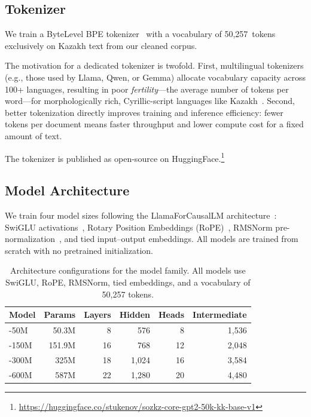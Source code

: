 \subsection{Tokenizer}
\label{sec:tokenizer}

We train a ByteLevel BPE tokenizer~\citep{sennrich2016bpe} with a vocabulary
of 50{,}257~tokens exclusively on Kazakh text from our cleaned corpus.

The motivation for a dedicated tokenizer is twofold. First, multilingual
tokenizers (e.g., those used by Llama, Qwen, or Gemma) allocate vocabulary
capacity across 100+ languages, resulting in poor \emph{fertility}---the average
number of tokens per word---for morphologically rich, Cyrillic-script languages
like Kazakh~\citep{rust2021tokenizer, toraman2023turkic}.
Second, better tokenization directly improves training and inference efficiency:
fewer tokens per document means faster throughput and lower compute cost for a
fixed amount of text.

The tokenizer is published as open-source on HuggingFace.\footnote{\url{https://huggingface.co/stukenov/sozkz-core-gpt2-50k-kk-base-v1}}

\subsection{Model Architecture}
\label{sec:architecture}

We train four model sizes following the LlamaForCausalLM
architecture~\citep{touvron2023llama}: SwiGLU activations~\citep{shazeer2020glu},
Rotary Position Embeddings (RoPE)~\citep{su2021rope}, RMSNorm
pre-normalization~\citep{zhang2019rmsnorm}, and tied input--output embeddings.
All models are trained from scratch with no pretrained initialization.

\begin{table}[ht]
  \centering
  \caption{Architecture configurations for the \sozkz{} model family.
           All models use SwiGLU, RoPE, RMSNorm, tied embeddings, and
           a vocabulary of 50{,}257 tokens.}
  \label{tab:architecture}
  \begin{tabular}{@{}lrrrrr@{}}
    \toprule
    Model & Params & Layers & Hidden & Heads & Intermediate \\
    \midrule
    \sozkz{}-50M   &  50.3M & 8  & 576   & 8  & 1{,}536 \\
    \sozkz{}-150M  & 151.9M & 16 & 768   & 12 & 2{,}048 \\
    \sozkz{}-300M  & 325M   & 18 & 1{,}024 & 16 & 3{,}584 \\
    \sozkz{}-600M  & 587M   & 22 & 1{,}280 & 20 & 4{,}480 \\
    \bottomrule
  \end{tabular}
\end{table}

